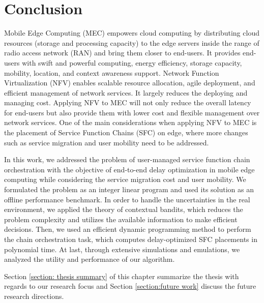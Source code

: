 \chapter{\textbf{Conclusion}}

Mobile Edge Computing (MEC) empowers cloud computing by distributing cloud resources (\eg storage and processing capacity) to the edge servers inside the range of radio access network (RAN) and bring them closer to end-users. It provides end-users with swift and powerful computing, energy efficiency, storage capacity, mobility, location, and context awareness support. Network Function Virtualization (NFV) enables scalable resource allocation, agile deployment, and efficient management of network services. It largely reduces the deploying and managing cost. 
Applying NFV to MEC will not only reduce the overall latency for end-users but also provide them with lower cost and flexible management over network services. One of the main considerations when applying NFV to MEC is the placement of Service Function Chains (SFC) on edge, where more changes such as service migration and user mobility need to be addressed. 


In this work, we addressed the problem of user-managed service function chain orchestration with the objective of end-to-end delay optimization in mobile edge computing while considering
the service migration cost and user mobility. We formulated
the problem as an integer linear program and used its solution as an offline performance benchmark.
In order to handle the uncertainties in the real environment, we applied the theory of contextual bandits, which reduces the problem complexity and utilizes the available information to make efficient decisions.
Then, we used an efficient dynamic programming method to perform the chain orchestration task, which computes delay-optimized SFC placements in polynomial time.
At last, through extensive simulations and emulations, we analyzed the utility and performance of our algorithm.

Section \ref{section: thesis summary} of this chapter summarize the thesis with regards to our research focus and Section \ref{section:future work} discuss the future research directions.



